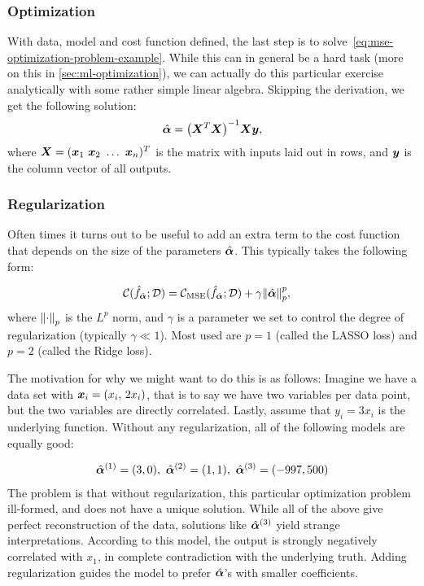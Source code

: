 \documentclass[Thesis.tex]{subfiles}
\begin{document}
\subsubsection{Optimization}

With data, model and cost function defined, the last step is to
solve~\cref{eq:mse-optimization-problem-example}. While this can in general be a
hard task (more on this in \cref{sec:ml-optimization}), we can
actually do this particular exercise analytically with some rather simple linear algebra. Skipping
the derivation, we get the following solution:
\begin{align}
  \hat{\bm{\alpha}} = \qty(\bm{X}^T\bm{X})^{-1}\bm{X}\bm{y},
\end{align}
where $\vX = (\vx_1\ \vx_2\ \dots\ \vx_n)^T$ is the matrix with inputs laid out in
rows, and $\bm{y}$ is the column vector of all outputs.

\subsubsection{Regularization}

Often times it turns out to be useful to add an extra term to the cost function
that depends on the size of the parameters $\hat{\bm{\alpha}}$. This typically takes
the following form:

\begin{align}
  \mathcal{C}(\hat f_{\hat{\bm{\alpha}}};\mathcal{D}) &=   \mathcal{C}_\text{MSE}(\hat f_{\hat{\bm{\alpha}}};\mathcal{D}) + \gamma\norm{\hat{\bm{\alpha}}}_p^p,
\end{align}
where $\norm{\cdot}_p$ is the $L^p$ norm, and $\gamma$ is a parameter
we set to control the degree of regularization (typically $\gamma\ll 1$). Most
used are $p=1$ (called the LASSO loss) and $p=2$ (called the Ridge loss).

The motivation for why we might want to do this is as follows: Imagine we have
a data set with $\bm{x}_i = (x_i,\,2x_i)$, that is to say we have two variables per
data point, but the two variables are directly correlated. Lastly, assume that
$y_i = 3x_i$ is the underlying function. Without any regularization, all of the
following models are equally good:

\begin{align}
  \hat\valpha^{(1)} = (3, 0),\ \hat\valpha^{(2)} = (1, 1),\ \hat\valpha^{(3)} = (-997, 500)
\end{align}
The problem is that without regularization, this particular
optimization problem ill-formed, and does not have a unique solution. While all
of the above give perfect reconstruction of the data, solutions like
$\hat{\bm{\alpha}}^{(3)}$ yield strange interpretations. According to this model, the
output is strongly negatively correlated with $x_1$, in complete contradiction
with the underlying truth. Adding regularization guides the model to prefer
$\hat{\bm{\alpha}}$'s with smaller coefficients.
\end{document}
